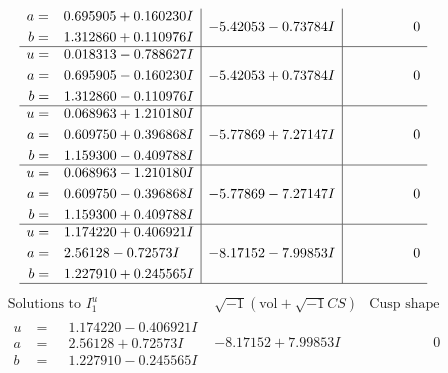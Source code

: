 \documentclass[1p]{elsarticle_modified}
\theoremstyle{definition}
\newcommand{\I}{\sqrt{-1}}
\begin{document}
$$\begin{array}{c|c|c}
\begin{aligned}
a &= \phantom{-}0.695905 + 0.160230 I \\
b &= \phantom{-}1.312860 + 0.110976 I\end{aligned}
 & -5.42053 - 0.73784 I & \phantom{-0.000000 } 0 \\ \hline\begin{aligned}
u &= \phantom{-}0.018313 - 0.788627 I \\
a &= \phantom{-}0.695905 - 0.160230 I \\
b &= \phantom{-}1.312860 - 0.110976 I\end{aligned}
 & -5.42053 + 0.73784 I & \phantom{-0.000000 } 0 \\ \hline\begin{aligned}
u &= \phantom{-}0.068963 + 1.210180 I \\
a &= \phantom{-}0.609750 + 0.396868 I \\
b &= \phantom{-}1.159300 - 0.409788 I\end{aligned}
 & -5.77869 + 7.27147 I & \phantom{-0.000000 } 0 \\ \hline\begin{aligned}
u &= \phantom{-}0.068963 - 1.210180 I \\
a &= \phantom{-}0.609750 - 0.396868 I \\
b &= \phantom{-}1.159300 + 0.409788 I\end{aligned}
 & -5.77869 - 7.27147 I & \phantom{-0.000000 } 0 \\ \hline\begin{aligned}
u &= \phantom{-}1.174220 + 0.406921 I \\
a &= \phantom{-}2.56128 - 0.72573 I \\
b &= \phantom{-}1.227910 + 0.245565 I\end{aligned}
 & -8.17152 - 7.99853 I & \phantom{-0.000000 } 0\\
 \hline 
 \end{array}$$\newpage$$\begin{array}{c|c|c}  
\text{Solutions to }I^u_{1}& \I (\text{vol} + \sqrt{-1}CS) & \text{Cusp shape}\\
 \hline 
\begin{aligned}
u &= \phantom{-}1.174220 - 0.406921 I \\
a &= \phantom{-}2.56128 + 0.72573 I \\
b &= \phantom{-}1.227910 - 0.245565 I\end{aligned}
 & -8.17152 + 7.99853 I & \phantom{-0.000000 } 0 \\ \hline\begin{aligned}

\end{aligned}
\end{array}$$
\end{document}
